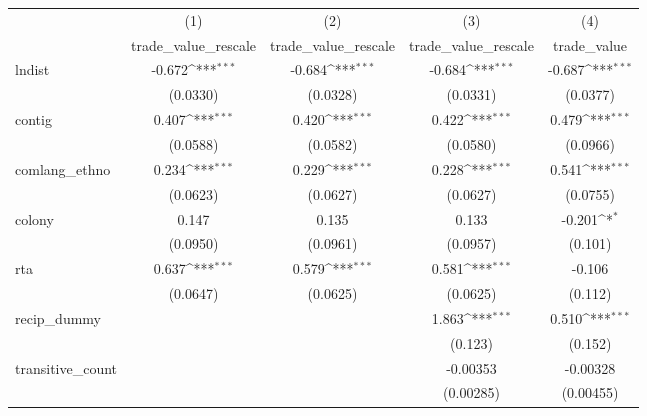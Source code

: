 {
\def\sym#1{\ifmmode^{#1}\else\(^{#1}\)\fi}
\begin{tabular}{l*{4}{c}}
\hline\hline
          &\multicolumn{1}{c}{(1)}&\multicolumn{1}{c}{(2)}&\multicolumn{1}{c}{(3)}&\multicolumn{1}{c}{(4)}\\
          &\multicolumn{1}{c}{trade\_value\_rescale}&\multicolumn{1}{c}{trade\_value\_rescale}&\multicolumn{1}{c}{trade\_value\_rescale}&\multicolumn{1}{c}{trade\_value}\\
\hline
lndist    &   -0.672\sym{***}&   -0.684\sym{***}&   -0.684\sym{***}&   -0.687\sym{***}\\
          & (0.0330)         & (0.0328)         & (0.0331)         & (0.0377)         \\

contig    &    0.407\sym{***}&    0.420\sym{***}&    0.422\sym{***}&    0.479\sym{***}\\
          & (0.0588)         & (0.0582)         & (0.0580)         & (0.0966)         \\

comlang\_ethno&    0.234\sym{***}&    0.229\sym{***}&    0.228\sym{***}&    0.541\sym{***}\\
          & (0.0623)         & (0.0627)         & (0.0627)         & (0.0755)         \\

colony    &    0.147         &    0.135         &    0.133         &   -0.201\sym{*}  \\
          & (0.0950)         & (0.0961)         & (0.0957)         &  (0.101)         \\

rta       &    0.637\sym{***}&    0.579\sym{***}&    0.581\sym{***}&   -0.106         \\
          & (0.0647)         & (0.0625)         & (0.0625)         &  (0.112)         \\



recip\_dummy&                  &                  &    1.863\sym{***}&    0.510\sym{***}\\
          &                  &                  &  (0.123)         &  (0.152)         \\

transitive\_count&                  &                  & -0.00353         & -0.00328         \\
          &                  &                  &(0.00285)         &(0.00455)         \\


\end{tabular}}
